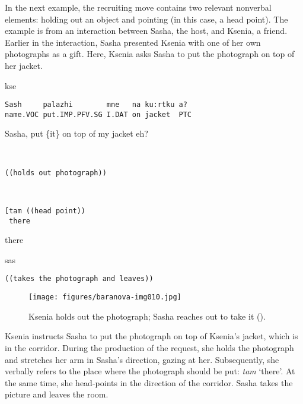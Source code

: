 \documentclass[output=paper,modfonts,nonflat]{langsci/langscibook}
\begin{document}
In the next example, the recruiting move contains two relevant nonverbal elements: holding out an object and pointing (in this case, a head point). The example is from an interaction between Sasha, the host, and Ksenia, a friend. Earlier in the interaction, Sasha presented Ksenia with one of her own photographs as a gift. Here, Ksenia asks Sasha to put the photograph on top of her jacket.

\vspace{-1mm}
%
\begin{mdframednoverticalspace}[style=firstfoc]
\begin{transbox}{1}{kse}
\begin{verbatim}
Sash     palazhi        mne   na ku:rtku a?
name.VOC put.IMP.PFV.SG I.DAT on jacket  PTC
\end{verbatim}
Sasha, put \{it\} on top of my jacket eh?
\end{transbox}
\end{mdframednoverticalspace}
%
\begin{transbox}{2}{~}
\begin{verbatim}
((holds out photograph))
\end{verbatim}
\end{transbox}
%
\begin{transbox}{3}{~}
\begin{verbatim}
[tam ((head point))
 there
\end{verbatim}
\hspace{0.07cm} there
\end{transbox}
%
\begin{mdframednoverticalspace}[style=secondfoc]
\begin{transbox}{4}{sas}
\begin{verbatim}
((takes the photograph and leaves))
\end{verbatim}
\end{transbox}
\end{mdframednoverticalspace}

\begin{figure}
\caption{Ksenia holds out the photograph; Sasha reaches out to take it ().}
\label{fig:baranova:10}
\texttt{[image: figures/baranova-img010.jpg]}
\end{figure}

Ksenia instructs Sasha to put the photograph on top of Ksenia's jacket, which is in the corridor. During the production of the request, she holds the photograph and stretches her arm in Sasha's direction, gazing at her. Subsequently, she verbally refers to the place where the photograph should be put: \textit{tam} ‘there’. At the same time, she head-points in the direction of the corridor. Sasha takes the picture and leaves the room.
\end{document}
